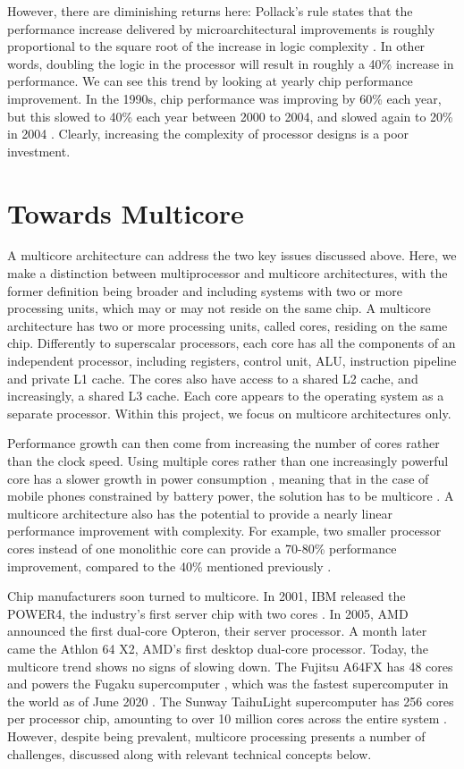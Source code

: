 \documentclass[bsc,frontabs,singlespacing,parskip,deptreport]{infthesis}
\begin{document}
However, there are diminishing returns here: Pollack’s rule states that the performance increase delivered by microarchitectural improvements is roughly proportional to the square root of the increase in logic complexity \cite{borkar_2007}. In other words, doubling the logic in the processor will result in roughly a 40\% increase in performance. We can see this trend by looking at yearly chip performance improvement. In the 1990s, chip performance was improving by 60\% each year, but this slowed to 40\% each year between 2000 to 2004, and slowed again to 20\% in 2004 \cite{geer_2005}. Clearly, increasing the complexity of processor designs is a poor investment.

\section{Towards Multicore} \label{towards-multicore}
A multicore architecture can address the two key issues discussed above. Here, we make a distinction between multiprocessor and multicore architectures, with the former definition being broader and including systems with two or more processing units, which may or may not reside on the same chip. A multicore architecture has two or more processing units, called cores, residing on the same chip. Differently to superscalar processors, each core has all the components of an independent processor, including registers, control unit, ALU, instruction pipeline and private L1 cache. The cores also have access to a shared L2 cache, and increasingly, a shared L3 cache. Each core appears to the operating system as a separate processor. Within this project, we focus on multicore architectures only.

Performance growth can then come from increasing the number of cores rather than the clock speed. Using multiple cores rather than one increasingly powerful core has a slower growth in power consumption \cite{blake_2009}, meaning that in the case of mobile phones constrained by battery power, the solution has to be multicore \cite{berkel_2009}. A multicore architecture also has the potential to provide a nearly linear performance improvement with complexity. For example, two smaller processor cores instead of one monolithic core can provide a 70-80\% performance improvement, compared to the 40\% mentioned previously \cite{borkar_2007}.

Chip manufacturers soon turned to multicore. In 2001, IBM released the POWER4, the industry’s first server chip with two cores \cite{power4}. In 2005, AMD announced the first dual-core Opteron, their server processor. A month later came the Athlon 64 X2, AMD’s first desktop dual-core processor. Today, the multicore trend shows no signs of slowing down. The Fujitsu A64FX has 48 cores and powers the Fugaku supercomputer \cite{a64fx}, which was the fastest supercomputer in the world as of June 2020 \cite{top500}. The Sunway TaihuLight supercomputer has 256 cores per processor chip, amounting to over 10 million cores across the entire system \cite{sunway}. However, despite being prevalent, multicore processing presents a number of challenges, discussed along with relevant technical concepts below.
\end{document}
